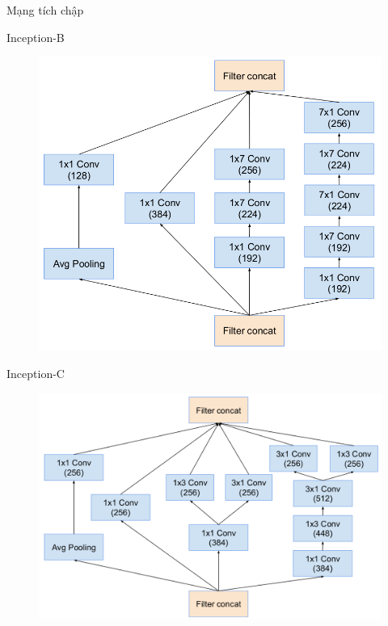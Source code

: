 \documentclass[compress]{beamer}
\begin{document}
\begin{frame}{Mạng tích chập}
\begin{frame}{Inception-B}
\begin{figure}[H]
\includegraphics[scale=0.3]{inceptionB.png}
\end{figure}
\end{frame}

\begin{frame}{Inception-C}
\begin{figure}[H]
\includegraphics[scale=0.29]{inceptionC.png}
\end{figure}
\end{frame}


\end{frame}
\end{document}
